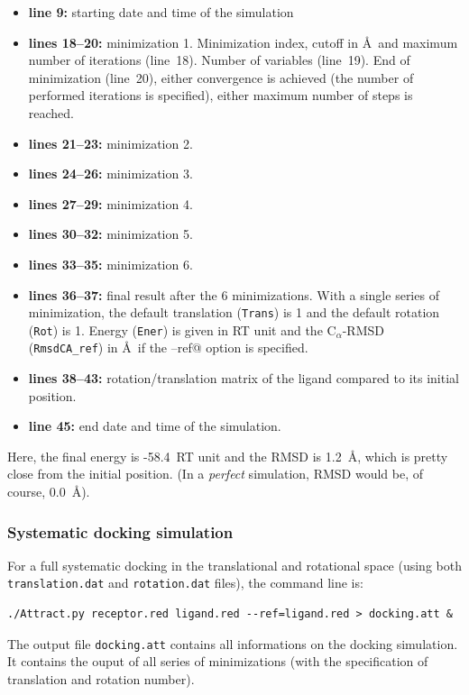 \documentclass[12pt,a4paper]{article}
\begin{document}
\begin{itemize}
\item{\bf line 9:} starting date and time of the simulation
\item{\bf lines 18--20:} minimization 1. Minimization index, cutoff 
in \AA\ and maximum number of iterations (line~18). 
Number of variables (line~19). End of minimization (line~20), either 
convergence is achieved (the number of performed iterations is specified), 
either maximum number of steps is reached.
\item{\bf lines 21--23:} minimization 2.
\item{\bf lines 24--26:} minimization 3.
\item{\bf lines 27--29:} minimization 4.
\item{\bf lines 30--32:} minimization 5.
\item{\bf lines 33--35:} minimization 6.
\item{\bf lines 36--37:} final result after the 6 minimizations. With a single series of minimization, the default translation ({\tt Trans}) is 1 and the default rotation ({\tt Rot}) is 1. 
Energy ({\tt Ener}) is given in RT unit and the C$_{\alpha}$-RMSD 
({\tt RmsdCA\_ref}) in \AA\ if the \verb@--ref@ option is specified.
\item{\bf lines 38--43:} rotation/translation matrix of the ligand compared to its initial position.
\item{\bf line 45:} end date and time of the simulation.
\end{itemize}

Here, the final energy is -58.4~RT unit and the RMSD is 1.2~\AA, which is pretty close from the initial position. (In a \emph{perfect} simulation, RMSD would be, of course, 0.0~\AA).

\subsubsection{Systematic docking simulation}

For a full systematic docking in the translational and rotational space (using both {\tt translation.dat} and {\tt rotation.dat} files), the command line is:
\begin{verbatim}
./Attract.py receptor.red ligand.red --ref=ligand.red > docking.att &
\end{verbatim}

The output file {\tt docking.att} contains all informations on the docking simulation. 
It contains the ouput of all series of minimizations (with the specification of translation and rotation number).
\end{document}
